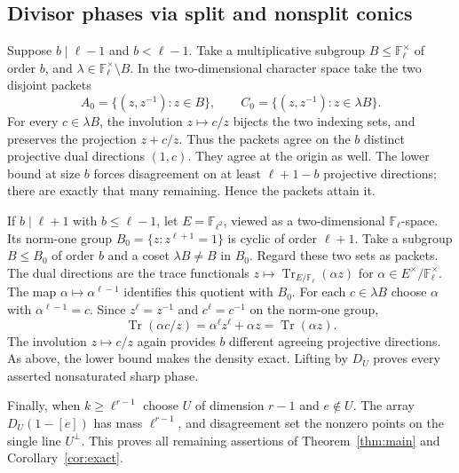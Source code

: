 \documentclass[11pt]{article}
\theoremstyle{remark}\newtheorem{remark}[theorem]{Remark}
\newcommand{\F}{\mathbb F}
\begin{document}
\subsection{Divisor phases via split and nonsplit conics}
Suppose $b\mid\ell-1$ and $b<\ell-1$. Take a multiplicative subgroup $B\le\F_\ell^\times$ of order $b$, and $\lambda\in\F_\ell^\times\setminus B$. In the two-dimensional character space take the two disjoint packets
\[
A_0=\{(z,z^{-1}):z\in B\},\qquad C_0=\{(z,z^{-1}):z\in\lambda B\}.
\]
For every $c\in\lambda B$, the involution $z\mapsto c/z$ bijects the two indexing sets, and preserves the projection $z+c/z$. Thus the packets agree on the $b$ distinct projective dual directions $(1,c)$. They agree at the origin as well. The lower bound at size $b$ forces disagreement on at least $\ell+1-b$ projective directions; there are exactly that many remaining. Hence the packets attain it.

If $b\mid\ell+1$ with $b\le\ell-1$, let $E=\F_{\ell^2}$, viewed as a two-dimensional $\F_\ell$-space. Its norm-one group $B_0=\{z:z^{\ell+1}=1\}$ is cyclic of order $\ell+1$. Take a subgroup $B\le B_0$ of order $b$ and a coset $\lambda B\ne B$ in $B_0$. Regard these two sets as packets. The dual directions are the trace functionals $z\mapsto\operatorname{Tr}_{E/\F_\ell}(\alpha z)$ for $\alpha\in E^\times/\F_\ell^\times$. The map $\alpha\mapsto\alpha^{\ell-1}$ identifies this quotient with $B_0$. For each $c\in\lambda B$ choose $\alpha$ with $\alpha^{\ell-1}=c$. Since $z^\ell=z^{-1}$ and $c^\ell=c^{-1}$ on the norm-one group,
\[
\operatorname{Tr}(\alpha c/z)=\alpha^\ell z^\ell+\alpha z=\operatorname{Tr}(\alpha z).
\]
The involution $z\mapsto c/z$ again provides $b$ different agreeing projective directions. As above, the lower bound makes the density exact. Lifting by $D_U$ proves every asserted nonsaturated sharp phase.

Finally, when $k\ge\ell^{r-1}$ choose $U$ of dimension $r-1$ and $e\notin U$. The array $D_U(1-[e])$ has mass $\ell^{r-1}$, and disagreement set the nonzero points on the single line $U^\perp$. This proves all remaining assertions of Theorem~\ref{thm:main} and Corollary~\ref{cor:exact}.
\end{document}
